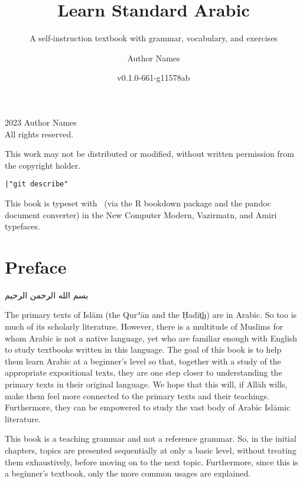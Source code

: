\documentclass[
  10pt,
]{book}
\title{Learn Standard Arabic}
\subtitle{A self-instruction textbook with grammar, vocabulary, and exercises}
\author{Author Names}
\date{v0.1.0-661-g11578ab}
\newcommand{\gitTag}{|"git describe"}
\begin{document}
\maketitle

\thispagestyle{empty}
\begingroup
\footnotesize
\parindent 0pt
\parskip \baselineskip
\textcopyright{} 2023 Author Names \\
All rights reserved.

    This work may not be distributed or modified, without written permission from the copyright holder.

\texttt{\gitTag}

This book is typeset with \XeLaTeX\ (via the R bookdown package and the pandoc document converter)
in the New Computer Modern, Vazirmatn, and Amiri typefaces.


\vfill




\endgroup
\clearpage

{
\setcounter{tocdepth}{1}
\tableofcontents
}
\chapter*{Preface}\label{preface}


\foreignlanguage{arabic}{بسم الله الرحمن الرحيم}

The primary texts of Islām (the Qurʾān and the Ḥadīt͟h) are in Arabic. So too is much of its scholarly literature. However, there is a multitude of Muslims for whom Arabic is not a native language, yet who are familiar enough with English to study textbooks written in this language. The goal of this book is to help them learn Arabic at a beginner's level so that, together with a study of the appropriate expositional texts, they are one step closer to understanding the primary texts in their original language. We hope that this will, if Allāh wills, make them feel more connected to the primary texts and their teachings. Furthermore, they can be empowered to study the vast body of Arabic Islāmic literature.

This book is a teaching grammar and not a reference grammar. So, in the initial chapters, topics are presented sequentially at only a basic level, without treating them exhaustively, before moving on to the next topic. Furthermore, since this is a beginner's textbook, only the more common usages are explained.
\end{document}
